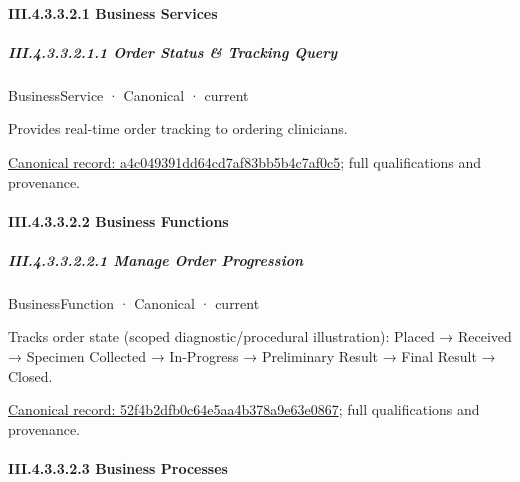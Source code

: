 \paragraph*{III.4.3.3.2.1 Business Services}
\label{navigation:III.4.3.3.2.1}

\subparagraph*{III.4.3.3.2.1.1 Order Status \& Tracking Query}
\label{navigation:III.4.3.3.2.1.1}

\label{element:a4c049391dd64cd7af83bb5b4c7af0c5}
{\small BusinessService · Canonical · current}\par

Provides real-time order tracking to ordering clinicians.


{\footnotesize \href{../../../../../../../continuum/business/business-service/a4c049391dd64cd7af83bb5b4c7af0c5.md}{Canonical record: a4c049391dd64cd7af83bb5b4c7af0c5}; full qualifications and provenance.}\par
\paragraph*{III.4.3.3.2.2 Business Functions}
\label{navigation:III.4.3.3.2.2}

\subparagraph*{III.4.3.3.2.2.1 Manage Order Progression}
\label{navigation:III.4.3.3.2.2.1}

\label{element:52f4b2dfb0c64e5aa4b378a9e63e0867}
{\small BusinessFunction · Canonical · current}\par

Tracks order state (scoped diagnostic/procedural illustration): Placed → Received → Specimen Collected → In-Progress → Preliminary Result → Final Result → Closed.


{\footnotesize \href{../../../../../../../continuum/business/business-function/52f4b2dfb0c64e5aa4b378a9e63e0867.md}{Canonical record: 52f4b2dfb0c64e5aa4b378a9e63e0867}; full qualifications and provenance.}\par
\paragraph*{III.4.3.3.2.3 Business Processes}
\label{navigation:III.4.3.3.2.3}

